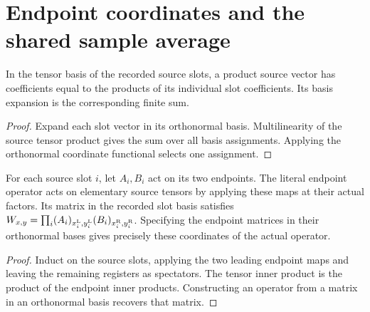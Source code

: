 \section{Endpoint coordinates and the shared sample average}
\label{sec:peps_endpoint_coordinates}

\begin{theorem}
    \label{thm:peps_actual_source_vector_coordinates}
    \leanok
    In the tensor basis of the recorded source slots, a product source
    vector has coefficients equal to the products of its individual slot
    coefficients. Its basis expansion is the corresponding finite sum.
\end{theorem}

\begin{proof}\leanok
    Expand each slot vector in its orthonormal basis. Multilinearity of
    the source tensor product gives the sum over all basis assignments.
    Applying the orthonormal coordinate functional selects one assignment.
\end{proof}

\begin{theorem}
    \label{thm:peps_actual_endpoint_coordinates}
    \leanok
    For each source slot $i$, let $A_i,B_i$ act on its two endpoints.
    The literal endpoint operator acts on elementary source tensors by
    applying these maps at their actual factors. Its matrix in the
    recorded slot basis satisfies
    $W_{x,y}=\prod_i (A_i)_{x_i^{\rm L},y_i^{\rm L}}
      (B_i)_{x_i^{\rm R},y_i^{\rm R}}$.
    Specifying the endpoint matrices in their orthonormal bases gives
    precisely these coordinates of the actual operator.
\end{theorem}

\begin{proof}\leanok
    Induct on the source slots, applying the two leading endpoint maps
    and leaving the remaining registers as spectators. The tensor inner
    product is the product of the endpoint inner products. Constructing
    an operator from a matrix in an orthonormal basis recovers that matrix.
\end{proof}

